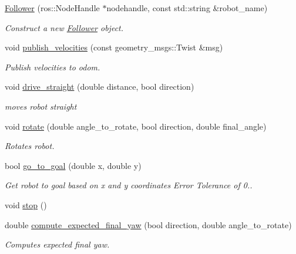 \begin{DoxyCompactItemize}
\item 
\hyperlink{class_follower_a6870e654b7cc901944ead12870a6b107}{Follower} (ros\+::\+Node\+Handle $\ast$nodehandle, const std\+::string \&robot\+\_\+name)
\begin{DoxyCompactList}\small\item\em Construct a new \hyperlink{class_follower}{Follower} object. \end{DoxyCompactList}\item 
void \hyperlink{class_follower_aaae1600959a929c269d557d9c09ba777}{publish\+\_\+velocities} (const geometry\+\_\+msgs\+::\+Twist \&msg)
\begin{DoxyCompactList}\small\item\em Publish velocities to odom. \end{DoxyCompactList}\item 
void \hyperlink{class_follower_ad4d1ce6f43ce65c0aa5a560247ca55ad}{drive\+\_\+straight} (double distance, bool direction)
\begin{DoxyCompactList}\small\item\em moves robot straight \end{DoxyCompactList}\item 
void \hyperlink{class_follower_abf8ec0da50295140bf750d30906a726b}{rotate} (double angle\+\_\+to\+\_\+rotate, bool direction, double final\+\_\+angle)
\begin{DoxyCompactList}\small\item\em Rotates robot. \end{DoxyCompactList}\item 
bool \hyperlink{class_follower_a08ab05cb32f0e6653939163dd22f344a}{go\+\_\+to\+\_\+goal} (double x, double y)
\begin{DoxyCompactList}\small\item\em Get robot to goal based on x and y coordinates Error Tolerance of 0.. \end{DoxyCompactList}\item 
void \hyperlink{class_follower_a84c17a75630c27bea4f401c8ab8e45b2}{stop} ()
\item 
double \hyperlink{class_follower_a5573bec72ce4aed99706213154849b65}{compute\+\_\+expected\+\_\+final\+\_\+yaw} (bool direction, double angle\+\_\+to\+\_\+rotate)
\begin{DoxyCompactList}\small\item\em Computes expected final yaw. \end{DoxyCompactList}\item 

\end{DoxyCompactItemize}
